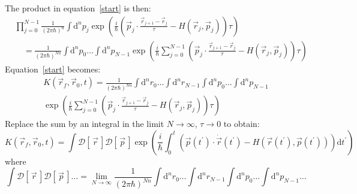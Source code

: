\documentclass[a4paper]{extarticle}
\newcommand{\tp}{t^\prime}
\newcommand{\dtp}{\text{d}\tp}
\newcommand{\dnp}[2]{\text{d}^{#1}p_{#2}}
\newcommand{\dnr}[2]{\text{d}^{#1}r_{#2}}
\newcommand{\func}[2]{\mathcal{#1}\left[\,#2\,\right]}
\newcommand{\ihbar}{\frac{i}{\hbar}}
\newcommand{\propagator}{K(\vec{r}_f, \vec{r}_0, t)}
\begin{document}
The product in equation~\ref{start} is then:
\begin{align*}
   & \prod_{j = 0}^{N - 1}
  \frac{1}{(2\pi\hbar)^{n}}
  \int\dnp{n}{j}
  \exp\left(\ihbar\left(
  \vec{p}_j \cdot \frac{\vec{r}_{j + 1}-\vec{r}_j}{\tau} - H(\vec{r}_j, \vec{p}_j)
  \right)\tau\right)
  \\
   & \quad =
  \frac{1}{(2\pi\hbar)^{N n}}
  \int\dnp{n}{0}\ldots\int\dnp{n}{N - 1}
  \exp\left(\ihbar\sum_{j = 0}^{N - 1}\left(
  \vec{p}_j \cdot \frac{\vec{r}_{j + 1}-\vec{r}_j}{\tau} - H(\vec{r}_j, \vec{p}_j)
  \right)\tau\right)
\end{align*}
Equation~\ref{start} becomes:
\begin{multline*}
  \propagator =
  \frac{1}{(2\pi\hbar)^{N n}}
  \int\dnr{n}{0}\ldots\int\dnr{n}{N - 1}\int\dnp{n}{0}\ldots\int\dnp{n}{N - 1}\\
  \exp\left(\ihbar\sum_{j = 0}^{N - 1}\left(
  \vec{p}_j \cdot \frac{\vec{r}_{j + 1}-\vec{r}_j}{\tau} - H(\vec{r}_j, \vec{p}_j)
  \right)\tau\right)
\end{multline*}
Replace the sum by an integral in the limit $N \to \infty$, $\tau \to 0$ to obtain:
\begin{equation*}
  \propagator = \int\func{D}{\vec{r}}\func{D}{\vec{p}}\exp\left(
  \ihbar\int_{0}^{t}\left(
  \vec{p}(\tp) \cdot \dot{\vec{r}}(\tp) - H(\vec{r}(\tp), \vec{p}(\tp))
  \right)\dtp
  \right)
\end{equation*}
where
\begin{equation*}
  \int\func{D}{\vec{r}}\func{D}{\vec{p}}\ldots
  = \lim_{N \to \infty}
  \frac{1}{(2\pi\hbar)^{N n}}
  \int\dnr{n}{0}\ldots\int\dnr{n}{N - 1}
  \int\dnp{n}{0}\ldots\int\dnp{n}{N - 1}
  \ldots
\end{equation*}
\end{document}
